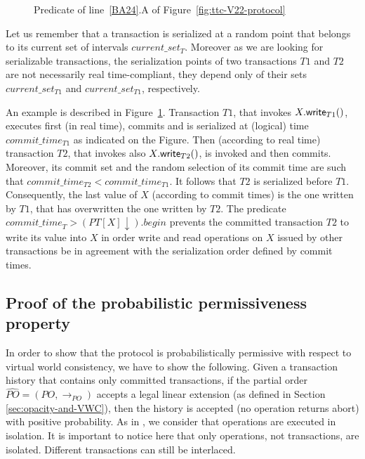 \begin{figure}[ht]
\centering
\scalebox{0.35}{}
\caption{Predicate of line~\ref{BA24}.A of Figure~\ref{fig:ttc-V22-protocol}}
\label{fig:predicate-line-BA24A}
\end{figure}



Let us remember that a transaction is serialized at a random point that 
belongs to its current set of intervals $current\_set_T$. Moreover as 
we are looking for serializable transactions, the serialization points 
of two transactions $T1$ and $T2$ are not necessarily real time-compliant, 
they depend only of their sets $current\_set_{T1}$ and $current\_set_{T1}$,
respectively. 

 
An example is described in Figure~\ref{fig:predicate-line-BA24A}.
Transaction $T1$, that invokes $X.{\sf write}_{T1}()$,  
executes first (in real time), commits and  is serialized 
at (logical) time $commit\_time_{T1}$ as indicated on the
Figure. 
Then  (according to real time) transaction $T2$, that invokes 
also $X.{\sf write}_{T2}()$,   is invoked and then commits. 
Moreover, its commit set and the random selection of its commit time 
are such that  $commit\_time_{T2} <commit\_time_{T1}$. It follows 
that $T2$ is serialized before $T1$. 
Consequently, the last value of $X$ (according to commit times) 
is the one written by $T1$, that has overwritten the one written by $T2$. 
The predicate $\mathit{commit\_time}_T > (PT[X] \downarrow).\mathit{begin}$
prevents the committed transaction $T2$ to write its value into $X$ 
in order write and  read operations on $X$ issued by other transactions 
be in agreement with the serialization order defined  by commit times. 






\subsection{Proof of the probabilistic permissiveness property}
\label{sec:proof-proba}

In order  to show  that the protocol  is probabilistically  permissive with
respect to virtual world consistency, we have to show the following. 
Given a  transaction history that contains only committed transactions,
if the partial order $\widehat{PO} = (PO,\rightarrow_{PO})$ accepts a legal
linear extension  
(as defined in Section \ref{sec:opacity-and-VWC}),  
then the history is accepted 
(no operation returns abort) with positive probability.
As in \cite{GHS08}, we consider that operations are executed in isolation. 
It is important to notice here that only operations,  
not transactions, are isolated. 
Different transactions can still be interlaced.

